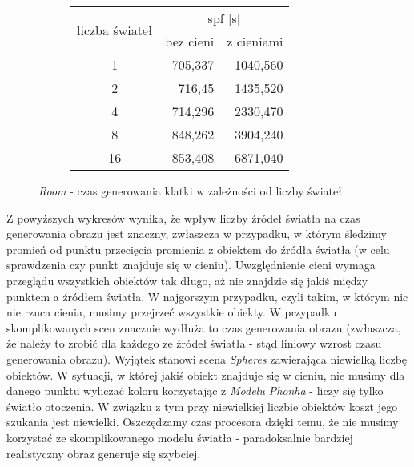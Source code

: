 \begin{figure}[H]
\begin{subfigure}{.45\textwidth}
\end{subfigure}
\hfill
\begin{subfigure}{.45\textwidth}
		\caption{Tabla z wynikami}
		\begin{longtable}{|c|r|r|} \hline
		\multirow{2}{*}{liczba świateł} & \multicolumn{2}{|c|}{spf [s]} \\ \cline{2-3}
	    & bez cieni & z cieniami \\ \hline
	    1 & 705,337 & 1040,560 \\
	    2 & 716,45 & 1435,520 \\
		4 & 714,296 & 2330,470 \\
		8 & 848,262 & 3904,240 \\
		16 & 853,408 & 6871,040 \\
		\hline
		\end{longtable}
\end{subfigure}
\caption{\emph{Room} - czas generowania klatki w zależności od liczby świateł}
\end{figure}

Z powyższych wykresów wynika, że wpływ liczby źródeł światła na czas generowania obrazu jest znaczny, zwłaszcza w przypadku, w którym śledzimy promień od punktu przecięcia promienia z obiektem do źródła światła (w celu sprawdzenia czy punkt znajduje się w cieniu). Uwzględnienie cieni wymaga przeglądu wszystkich obiektów tak długo, aż nie znajdzie się jakiś między punktem a źródłem światła. W najgorszym przypadku, czyli takim, w którym nic nie rzuca cienia, musimy przejrzeć wszystkie obiekty. W przypadku skomplikowanych scen znacznie wydłuża to czas generowania obrazu (zwłaszcza, że należy to zrobić dla każdego ze źródeł światła - stąd liniowy wzrost czasu generowania obrazu). Wyjątek stanowi scena \emph{Spheres} zawierająca niewielką liczbę obiektów. W sytuacji, w której jakiś obiekt znajduje się w cieniu, nie musimy dla danego punktu wyliczać koloru korzystając z \emph{Modelu Phonha} - liczy się tylko światło otoczenia. W związku z tym przy niewielkiej liczbie obiektów koszt jego szukania jest niewielki. Oszczędzamy czas procesora dzięki temu, że nie musimy korzystać ze skomplikowanego modelu światła - paradoksalnie bardziej realistyczny obraz generuje się szybciej.

